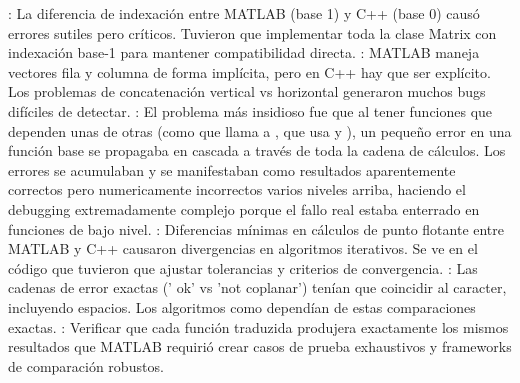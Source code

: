 \markdownRendererDocumentBegin
\markdownRendererSectionBegin
{}\markdownRendererInterblockSeparator
{}\markdownRendererSectionBegin
{}\markdownRendererInterblockSeparator
{}: La diferencia de indexación entre MATLAB (base 1) y C++ (base 0) causó errores sutiles pero críticos. Tuvieron que implementar toda la clase Matrix con indexación base-1 para mantener compatibilidad directa.\markdownRendererInterblockSeparator
{}: MATLAB maneja vectores fila y columna de forma implícita, pero en C++ hay que ser explícito. Los problemas de concatenación vertical vs horizontal generaron muchos bugs difíciles de detectar.\markdownRendererInterblockSeparator
{}: El problema más insidioso fue que al tener funciones que dependen unas de otras (como  que llama a , que usa  y ), un pequeño error en una función base se propagaba en cascada a través de toda la cadena de cálculos. Los errores se acumulaban y se manifestaban como resultados aparentemente correctos pero numericamente incorrectos varios niveles arriba, haciendo el debugging extremadamente complejo porque el fallo real estaba enterrado en funciones de bajo nivel.\markdownRendererInterblockSeparator
{}: Diferencias mínimas en cálculos de punto flotante entre MATLAB y C++ causaron divergencias en algoritmos iterativos. Se ve en el código que tuvieron que ajustar tolerancias y criterios de convergencia.\markdownRendererInterblockSeparator
{}: Las cadenas de error exactas (' ok' vs 'not coplanar') tenían que coincidir al caracter, incluyendo espacios. Los algoritmos como  dependían de estas comparaciones exactas.\markdownRendererInterblockSeparator
{}: Verificar que cada función traduzida produjera exactamente los mismos resultados que MATLAB requirió crear casos de prueba exhaustivos y frameworks de comparación robustos.
\markdownRendererSectionEnd 
\markdownRendererSectionEnd \markdownRendererDocumentEnd